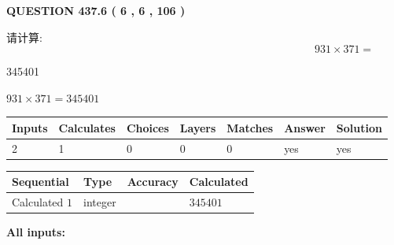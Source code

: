 \documentclass{ctexart}
\begin{document}
{\textbf{\Large{QUESTION
437.6 
 ( 6 , 6 , 106 )
}}}
  
  
 
请计算:
\begin{equation}
931  \times    %
371 = \nonumber
\end{equation}
 
 
 
\noindent{}
 
 

345401
 
 
\noindent{}
 
 

 
 
 
\noindent{}
 
 

$ %
931 \times  %
371=   %
345401$
 
 
\noindent{}
 
 

 
   
   
   
   
\noindent\begin{tabular}{|l|l|l|l|l|l|l|}
 \hline
Inputs & Calculates & Choices & Layers & Matches & Answer & Solution \\ \hline
 2  & 
 1  & 
 0
  & 
 0  & 
 0  & 
  yes & 
  yes 
  \\ \hline
 \end{tabular}
   
   
   
   
\noindent{}
   
   
  
  
\noindent\begin{tabular}{|l|l|l|l|}
\hline
 Sequential & Type & Accuracy & Calculated \\ 
\hline
 
 
  Calculated $  1 $ & integer &  & 
  $ 345401 $ 
 \\  \hline  
 \end{tabular}
   
   
   
   
\noindent\vspace{0.1in}\hspace{-0.08in} {\textbf{\Large{All inputs: }}}
   
\end{document}
